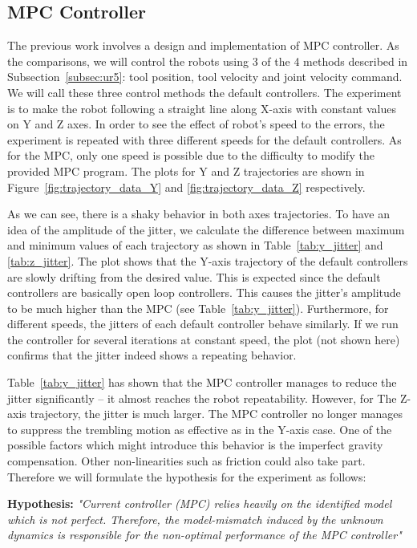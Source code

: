 \newpage
\subsection{\ac{MPC} Controller}
The previous work involves a design and implementation of \ac {MPC} controller. As the comparisons, we will control the robots using 3 of the 4 methods described in Subsection~\ref{subsec:ur5}: tool position, tool velocity and joint velocity command. We will call these three control methods the default controllers. The experiment is to make the robot following a straight line along X-axis with constant values on Y and Z axes.  In order to see the effect of robot's speed to the errors, the experiment is repeated with three different speeds for the default controllers. As for the \ac {MPC}, only one speed is possible due to the difficulty to modify the provided \ac {MPC} program. The plots for Y and Z trajectories are shown in Figure~\ref{fig:trajectory_data_Y} and \ref{fig:trajectory_data_Z} respectively. 

As we can see, there is a shaky behavior in both axes trajectories. To have an idea of the amplitude of the jitter, we calculate the difference between maximum and minimum values of each trajectory as shown in Table~\ref{tab:y_jitter} and \ref{tab:z_jitter}. The plot shows that the Y-axis trajectory of the default controllers are slowly drifting from the desired value. This is expected since the default controllers are basically open loop controllers. This causes the jitter's amplitude to be much higher than the \ac {MPC} (see Table~\ref{tab:y_jitter}). Furthermore, for different speeds, the jitters of each default controller behave similarly. If we run the controller for several iterations at constant speed, the plot (not shown here) confirms that the jitter indeed shows a repeating behavior. 

Table~\ref{tab:y_jitter} has shown that the \ac {MPC} controller manages to reduce the jitter significantly -- it almost reaches the robot repeatability. However, for The Z-axis trajectory, the jitter is much larger. The \ac {MPC} controller no longer manages to suppress the trembling motion as effective as in the Y-axis case. One of the possible factors which might introduce this behavior is the imperfect gravity compensation. Other non-linearities such as friction could also take part. Therefore we will formulate the hypothesis for the experiment as follows:

\textbf{Hypothesis:} \textit{"Current controller (\ac {MPC}) relies heavily on the identified model which is not perfect. Therefore, the model-mismatch induced by the unknown dynamics is responsible for the non-optimal performance of the \ac {MPC} controller" }

